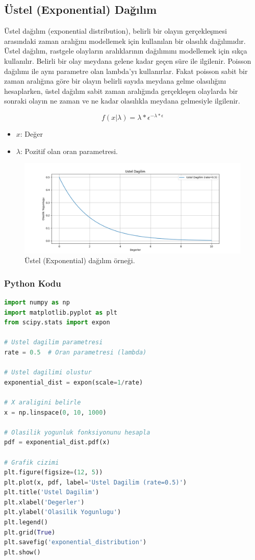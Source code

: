 \newpage

\subsection{Üstel (Exponential) Dağılım}
Üstel dağılım (exponential distribution), belirli bir olayın gerçekleşmesi arasındaki zaman aralığını modellemek için kullanılan bir olasılık dağılımıdır. Üstel dağılım, rastgele olayların aralıklarının dağılımını modellemek için sıkça kullanılır. Belirli bir olay meydana gelene kadar geçen süre ile ilgilenir. Poisson dağılımı ile aynı parametre olan lambda'yı kullanırlar. Fakat poisson sabit bir zaman aralığına göre bir olayın belirli sayıda meydana gelme olasılığını hesaplarken, üstel dağılım sabit zaman aralığında gerçekleşen olaylarda bir sonraki olayın ne zaman ve ne kadar olasılıkla meydana gelmesiyle ilgilenir.

\[f(x | \lambda) = \lambda * \epsilon ^{-\lambda * \epsilon}\]
\begin{itemize}
	\item $x$: Değer
	\item $\lambda$: Pozitif olan oran parametresi.
\end{itemize}

\begin{figure}[h]
    \centering
    \includegraphics[width=1\textwidth]{images/exponential_distribution.png}
    \caption{Üstel (Exponential) dağılım örneği.}
    \label{fig:enter-label}
\end{figure}

\subsubsection{Python Kodu}

\begin{lstlisting}[language=Python]
import numpy as np
import matplotlib.pyplot as plt
from scipy.stats import expon

# Ustel dagilim parametresi
rate = 0.5  # Oran parametresi (lambda)

# Ustel dagilimi olustur
exponential_dist = expon(scale=1/rate)

# X araligini belirle
x = np.linspace(0, 10, 1000)

# Olasilik yogunluk fonksiyonunu hesapla
pdf = exponential_dist.pdf(x)

# Grafik cizimi
plt.figure(figsize=(12, 5))
plt.plot(x, pdf, label='Ustel Dagilim (rate=0.5)')
plt.title('Ustel Dagilim')
plt.xlabel('Degerler')
plt.ylabel('Olasilik Yogunlugu')
plt.legend()
plt.grid(True)
plt.savefig('exponential_distribution')
plt.show()
\end{lstlisting}

